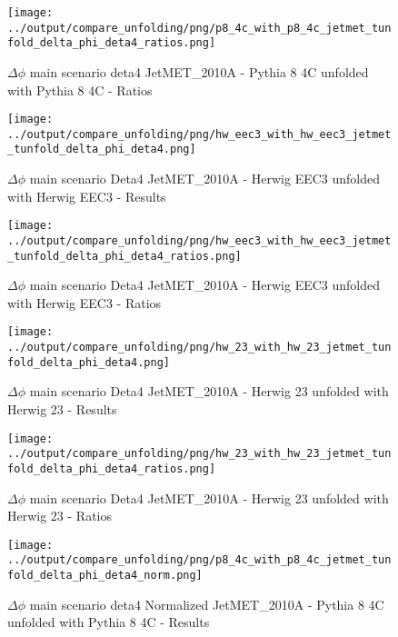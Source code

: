 \documentclass[11pt]{book}
\begin{document}
\begin{figure}[ht]
\centering
\texttt{[image: ../output/compare\_unfolding/png/p8\_4c\_with\_p8\_4c\_jetmet\_tunfold\_delta\_phi\_deta4\_ratios.png]}
\caption{$\Delta\phi$ main scenario deta4 JetMET\_2010A - Pythia 8 4C unfolded with Pythia 8 4C - Ratios}
\label{p8_p8_jetmet_tunfold_delta_phi_deta4_b}
\end{figure}

\begin{figure}[ht]
\centering
\texttt{[image: ../output/compare\_unfolding/png/hw\_eec3\_with\_hw\_eec3\_jetmet\_tunfold\_delta\_phi\_deta4.png]}
\caption{$\Delta\phi$ main scenario Deta4 JetMET\_2010A - Herwig EEC3 unfolded with Herwig EEC3 - Results}
\label{hw_eec3_hw_eec3_jetmet_tunfold_delta_phi_deta4_a}
\end{figure}

\begin{figure}[ht]
\centering
\texttt{[image: ../output/compare\_unfolding/png/hw\_eec3\_with\_hw\_eec3\_jetmet\_tunfold\_delta\_phi\_deta4\_ratios.png]}
\caption{$\Delta\phi$ main scenario Deta4 JetMET\_2010A - Herwig EEC3 unfolded with Herwig EEC3 - Ratios}
\label{hw_eec3_hw_eec3_jetmet_tunfold_delta_phi_deta4_b}
\end{figure}

\begin{figure}[ht]
\centering
\texttt{[image: ../output/compare\_unfolding/png/hw\_23\_with\_hw\_23\_jetmet\_tunfold\_delta\_phi\_deta4.png]}
\caption{$\Delta\phi$ main scenario Deta4 JetMET\_2010A - Herwig 23 unfolded with Herwig 23 - Results}
\label{hw_23_hw_23_jetmet_tunfold_delta_phi_deta4_a}
\end{figure}

\begin{figure}[ht]
\centering
\texttt{[image: ../output/compare\_unfolding/png/hw\_23\_with\_hw\_23\_jetmet\_tunfold\_delta\_phi\_deta4\_ratios.png]}
\caption{$\Delta\phi$ main scenario Deta4 JetMET\_2010A - Herwig 23 unfolded with Herwig 23 - Ratios}
\label{hw_23_hw_23_jetmet_tunfold_delta_phi_deta4_b}
\end{figure}



\begin{figure}[ht]
\centering
\texttt{[image: ../output/compare\_unfolding/png/p8\_4c\_with\_p8\_4c\_jetmet\_tunfold\_delta\_phi\_deta4\_norm.png]}
\caption{$\Delta\phi$ main scenario deta4 Normalized JetMET\_2010A - Pythia 8 4C unfolded with Pythia 8 4C - Results}
\label{p8_p8_jetmet_tunfold_delta_phi_deta4_norm_a}
\end{figure}
\end{document}
